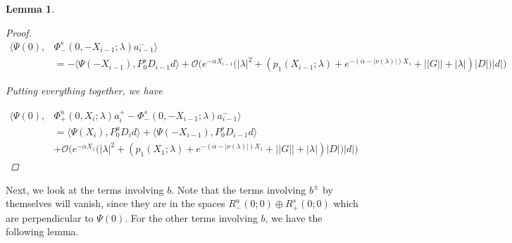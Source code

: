 \documentclass[12pt]{article}
\newtheorem{lemma}{Lemma}
\begin{document}
\begin{lemma}
\begin{proof}
\begin{align*}
\langle \Psi(0), &\Phi^s_-(0, -X_{i-1}; \lambda)a_{i-1}^- \rangle \\
&= -\langle \Psi(-X_{i-1}), P^s_0 D_{i-1} d \rangle
+ \mathcal{O}\Big(e^{-\alpha X_{i-1}} \Big( |\lambda|^2  + (p_1(X_{i-1}; \lambda) + e^{-(\alpha - |\nu(\lambda)|) X_1} + ||G|| + |\lambda|)|D| \Big)|d| \Big)
\end{align*}

Putting everything together, we have

\begin{align*}
\langle \Psi(0), &\Phi^u_+(0, X_i; \lambda)a_i^+ - \Phi^s_-(0, -X_{i-1}; \lambda)a_{i-1}^- \rangle \\
&= \langle \Psi(X_i), P^u_0 D_i d \rangle + \langle \Psi(-X_{i-1}), P^s_0 D_{i-1} d \rangle \\
&+ \mathcal{O}\Big(e^{-\alpha X_1} \Big( |\lambda|^2  + (p_1(X_1; \lambda) + e^{-(\alpha - |\nu(\lambda)|) X_1} + ||G|| + |\lambda|)|D| \Big)|d| \Big)
\end{align*}

\end{proof}

\end{lemma}

Next, we look at the terms involving $b$. Note that the terms involving $b^\pm$ by themselves will vanish, since they are in the spaces $R^u_-(0; 0) \oplus R^s_+(0; 0)$ which are perpendicular to $\Psi(0)$. For the other terms involving $b$, we have the following lemma.

\end{document}

